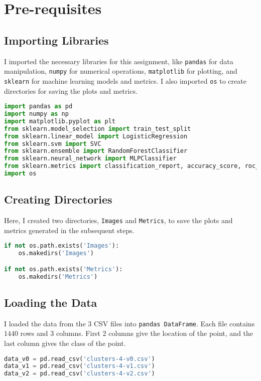 \section*{Pre-requisites}

\subsection{Importing Libraries}

I imported the necessary libraries for this assignment, like \texttt{pandas} for data manipulation, \texttt{numpy} for numerical operations, \texttt{matplotlib} for plotting, and \texttt{sklearn} for machine learning models and metrics. I also imported \texttt{os} to create directories for saving the plots and metrics.

\begin{lstlisting}[language=Python, caption=Importing Libraries]
import pandas as pd
import numpy as np
import matplotlib.pyplot as plt
from sklearn.model_selection import train_test_split
from sklearn.linear_model import LogisticRegression
from sklearn.svm import SVC
from sklearn.ensemble import RandomForestClassifier
from sklearn.neural_network import MLPClassifier
from sklearn.metrics import classification_report, accuracy_score, roc_auc_score, roc_curve
import os
\end{lstlisting}

\subsection{Creating Directories}

Here, I created two directories, \texttt{Images} and \texttt{Metrics}, to save the plots and metrics generated in the subsequent steps.

\begin{lstlisting}[language=Python, caption=Creating Directories]
if not os.path.exists('Images'):
    os.makedirs('Images')

if not os.path.exists('Metrics'):
    os.makedirs('Metrics')
\end{lstlisting}

\subsection{Loading the Data}

I loaded the data from the $3$ CSV files into \texttt{pandas DataFrame}. Each file contains $1440$ rows and $3$ columns. First $2$ columns give the location of the point, and the last column gives the class of the point.

\begin{lstlisting}[language=Python, caption=Loading the Data]
data_v0 = pd.read_csv('clusters-4-v0.csv')
data_v1 = pd.read_csv('clusters-4-v1.csv')
data_v2 = pd.read_csv('clusters-4-v2.csv')
\end{lstlisting}



